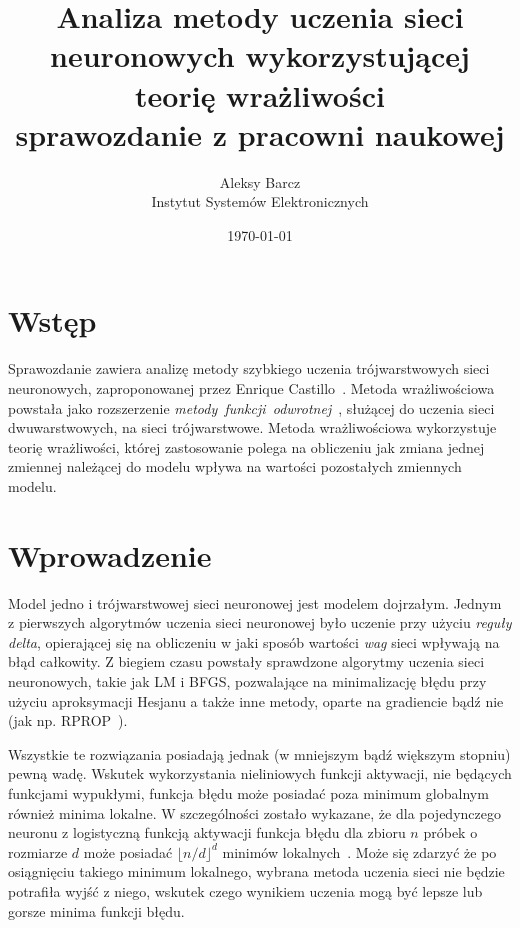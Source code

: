 \documentclass[11pt,a4paper]{article}
\date {\today}
\author {
Aleksy Barcz\\
Instytut Systemów Elektronicznych
}
\title{\vspace{60mm} \textbf{Analiza metody uczenia sieci neuronowych wykorzystującej teorię wrażliwości} \\ sprawozdanie z pracowni naukowej}
\begin{document}
\maketitle
\thispagestyle{empty}

\newpage

\tableofcontents

\newpage

\section{Wstęp}
Sprawozdanie zawiera analizę metody szybkiego uczenia trójwarstwowych sieci neuronowych, zaproponowanej przez Enrique Castillo~\cite{castillo2006very}. Metoda wrażliwościowa powstała jako rozszerzenie \emph{metody~funkcji~odwrotnej}~\cite{castillo2002global}, służącej do uczenia sieci dwuwarstwowych, na sieci trójwarstwowe. Metoda wrażliwościowa wykorzystuje teorię wrażliwości, której zastosowanie polega na obliczeniu jak zmiana jednej zmiennej należącej do modelu wpływa na wartości pozostałych zmiennych modelu.

\section{Wprowadzenie}
Model jedno i trójwarstwowej sieci neuronowej jest modelem dojrzałym. Jednym z pierwszych algorytmów uczenia sieci neuronowej było uczenie przy użyciu \emph{reguły delta}, opierającej się na obliczeniu w jaki sposób wartości \emph{wag} sieci wpływają na błąd całkowity. Z biegiem czasu powstały sprawdzone algorytmy uczenia sieci neuronowych, takie jak LM i BFGS, pozwalające na minimalizację błędu przy użyciu aproksymacji Hesjanu a także inne metody, oparte na gradiencie bądź nie (jak np. RPROP~\cite{riedmiller1993direct}).

Wszystkie te rozwiązania posiadają jednak (w mniejszym bądź większym stopniu) pewną wadę. Wskutek wykorzystania nieliniowych funkcji aktywacji, nie będących funkcjami wypukłymi, funkcja błędu może posiadać poza minimum globalnym również minima lokalne. W szczególności zostało wykazane, że dla pojedynczego neuronu z logistyczną funkcją aktywacji funkcja błędu dla zbioru $n$ próbek o rozmiarze $d$ może posiadać $\lfloor n/d \rfloor^{d}$ minimów lokalnych~\cite{auer1996exponentially}. Może się zdarzyć że po osiągnięciu takiego minimum lokalnego, wybrana metoda uczenia sieci nie będzie potrafiła wyjść z niego, wskutek czego wynikiem uczenia mogą być lepsze lub gorsze minima funkcji błędu.
\end{document}
